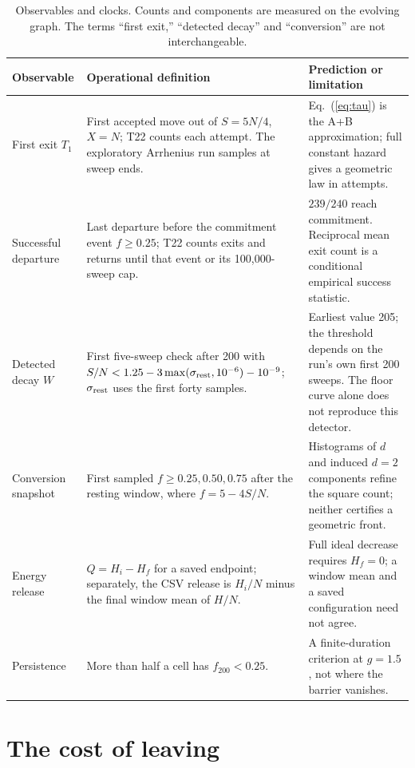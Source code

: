 \documentclass[aps,pre,10pt,twocolumn,superscriptaddress,nofootinbib]{revtex4-2}
\begin{document}
\begin{table}[t]
\caption{Observables and clocks. Counts and components are measured on the evolving graph. The terms
``first exit,'' ``detected decay'' and ``conversion'' are not interchangeable.}
\label{tab:clocks}
\begin{ruledtabular}
\begin{tabular}{p{}p{}p{}}
Observable & Operational definition & Prediction or limitation \\
\hline
First exit $T_1$ & First accepted move out of $S=5N/4$, $X=N$; T22 counts each attempt.
The exploratory Arrhenius run samples at sweep ends. & Eq.~(\ref{eq:tau}) is the A+B approximation;
full constant hazard gives a geometric law in attempts. \\
Successful departure & Last departure before the commitment event $f\ge0.25$; T22 counts exits and
returns until that event or its 100,000-sweep cap. & $239/240$ reach commitment. Reciprocal mean
exit count is a conditional empirical success statistic. \\
Detected decay $W$ & First five-sweep check after 200 with $S/N<1.25-3\max(\sigma_{\rm rest},10^{-6})-10^{-9}$;
$\sigma_{\rm rest}$ uses the first forty samples. & Earliest value 205; the threshold depends on the run's own first 200 sweeps.
The floor curve alone does not reproduce this detector. \\
Conversion snapshot & First sampled $f\ge0.25,0.50,0.75$ after the resting window, where
$f=5-4S/N$. & Histograms of $d$ and induced $d=2$ components refine the square count;
neither certifies a geometric front. \\
Energy release & $Q=H_i-H_f$ for a saved endpoint; separately, the CSV release is $H_i/N$ minus
the final window mean of $H/N$. & Full ideal decrease requires $H_f=0$; a window mean and a
saved configuration need not agree. \\
Persistence & More than half a cell has $f_{200}<0.25$. & A finite-duration criterion at $g=1.5$,
not where the barrier vanishes. \\
\end{tabular}
\end{ruledtabular}
\end{table}

\section{The cost of leaving}
\label{sec:cost}
\end{document}
